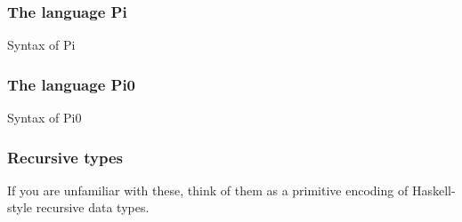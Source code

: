 \documentclass[svgnames,11pt]{beamer}
\begin{document}
\begin{frame}
\frametitle{ The language {{Pi}} }


\begin{block}{Syntax of {{Pi}} }
%

\end{block}

\end{frame}


\begin{frame}
\frametitle{ The language {{Pi0}} }


\begin{block}{Syntax of {{Pi0}} }
%

\end{block}

\end{frame}


\begin{frame}
\frametitle{ Recursive types }

\vfill

%

\vfill

If you are unfamiliar with these, think of them as a primitive
encoding of Haskell-style recursive data types. 


\end{frame}
\end{document}
